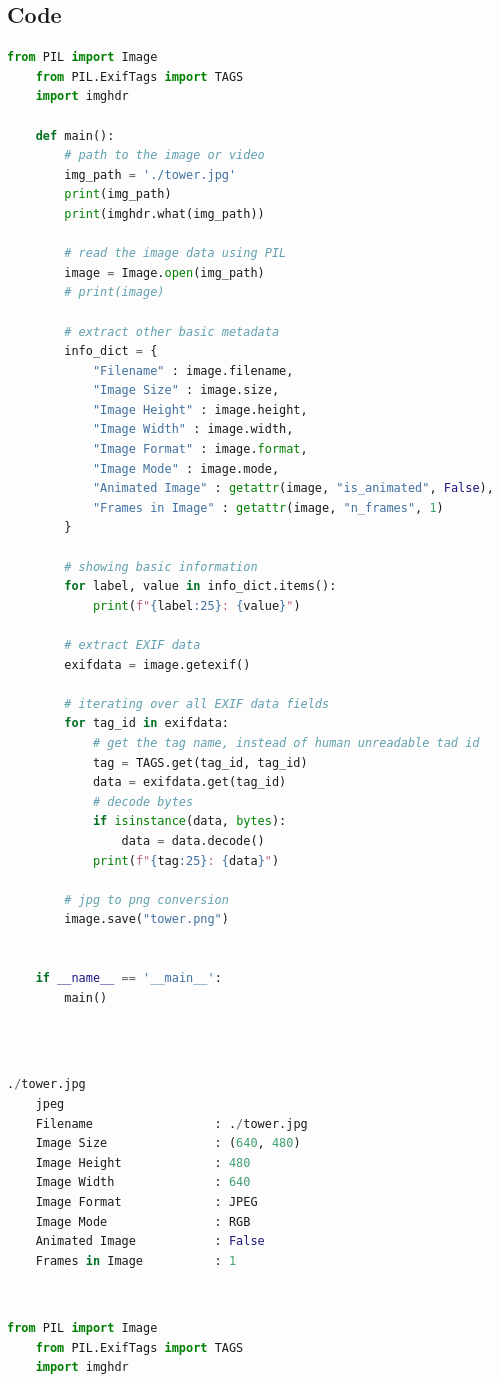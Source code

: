 \documentclass{article}
\begin{document}
{    \subsection{Code}
    \lstset{style=mystyle}
    \begin{lstlisting}[language=Python, caption=Code for JPEG to PNG Image Conversion]
    from PIL import Image
    from PIL.ExifTags import TAGS 
    import imghdr
    
    def main():
        # path to the image or video
        img_path = './tower.jpg'
        print(img_path)
        print(imghdr.what(img_path))
    
        # read the image data using PIL
        image = Image.open(img_path)
        # print(image)
    
        # extract other basic metadata
        info_dict = {
            "Filename" : image.filename,
            "Image Size" : image.size,
            "Image Height" : image.height,
            "Image Width" : image.width,
            "Image Format" : image.format,
            "Image Mode" : image.mode,
            "Animated Image" : getattr(image, "is_animated", False),
            "Frames in Image" : getattr(image, "n_frames", 1)
        }
    
        # showing basic information
        for label, value in info_dict.items():
            print(f"{label:25}: {value}")
        
        # extract EXIF data
        exifdata = image.getexif()
    
        # iterating over all EXIF data fields
        for tag_id in exifdata:
            # get the tag name, instead of human unreadable tad id
            tag = TAGS.get(tag_id, tag_id)
            data = exifdata.get(tag_id)
            # decode bytes
            if isinstance(data, bytes):
                data = data.decode()
            print(f"{tag:25}: {data}")
        
        # jpg to png conversion
        image.save("tower.png")
        
    
    if __name__ == '__main__':
        main()
    
    \end{lstlisting}
    \\
    \lstset{style=mystyle}
    \begin{lstlisting}[language=Python, caption=Output of JPEG to PNG Image Conversion]
    ./tower.jpg
    jpeg
    Filename                 : ./tower.jpg
    Image Size               : (640, 480)
    Image Height             : 480
    Image Width              : 640
    Image Format             : JPEG
    Image Mode               : RGB
    Animated Image           : False
    Frames in Image          : 1
    \end{lstlisting}
    \\
    \lstset{style=mystyle}
    \begin{lstlisting}[language=Python, caption=Code for PNG to JPEG Image Conversion]
    from PIL import Image
    from PIL.ExifTags import TAGS 
    import imghdr
    

\end{lstlisting}}
\end{document}
